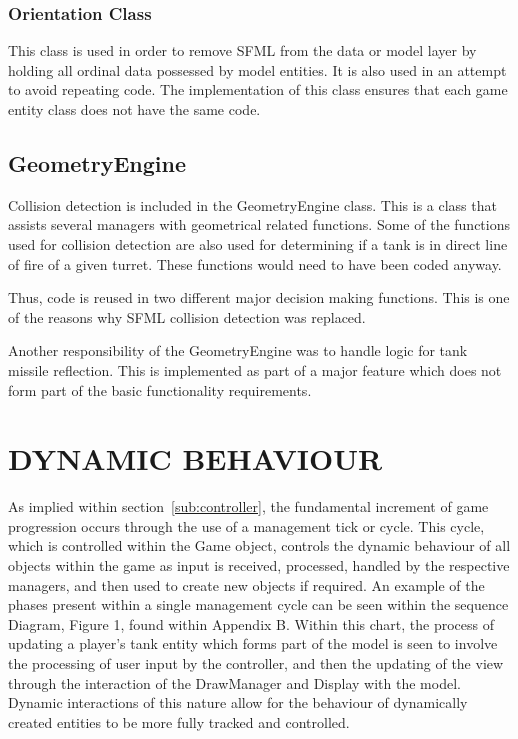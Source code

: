 \documentclass[10pt,twocolumn]{witseiepaper}
\begin{document}
\subsubsection{Orientation Class}
This class is used in order to remove SFML from the data or model layer by holding all ordinal data possessed by model entities. It is also used in an attempt to avoid repeating code. The implementation of this class ensures that each game entity class does not have the same code.

\subsection{GeometryEngine}
\label{sub:geometry}
Collision detection is included in the GeometryEngine class. This is a class that assists several managers with geometrical related functions. Some of the functions used for collision detection are also used for determining if a tank is in direct line of fire of a given turret. These functions would need to have been coded anyway. 

Thus, code is reused in two different major decision making functions. This is one of the reasons why SFML collision detection was replaced. 

Another responsibility of the GeometryEngine was to handle logic for tank missile reflection. This is implemented as part of a major feature which does not form part of the basic functionality requirements.





\section{DYNAMIC BEHAVIOUR} 

As implied within section~\ref{sub:controller}, the fundamental increment of game progression occurs through the use of a management tick or cycle. This cycle, which is controlled within the Game object, controls the dynamic behaviour of all objects within the game as input is received, processed, handled by the respective managers, and then used to create new objects if required. An example of the phases present within a single management cycle can be seen within the sequence Diagram, Figure 1, found within Appendix B. Within this chart, the process of updating a player's tank entity which forms part of the model is seen to involve the processing of user input by the controller, and then the updating of the view through the interaction of the DrawManager and Display with the model. Dynamic interactions of this nature allow for the behaviour of dynamically created entities to be more fully tracked and controlled.  
\end{document}
